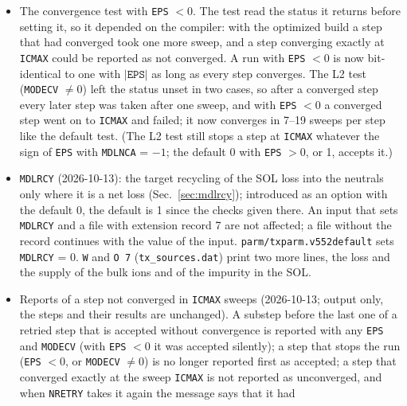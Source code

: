 \documentclass[11pt]{article}
\begin{document}
\begin{itemize}
  60) was read into arrays of the old size and the program stopped in the spline of the mesh.  They
  are now allocated again when \texttt{NRMAX} differs from their size; the ripple and NTV arrays,
  kept in the same way, likewise (with \texttt{FSRP} $\ne 0$ a \texttt{RUN} with another
  \texttt{NRMAX} in the same process corrupted the heap).  Such a \texttt{LOAD} now gives the state of
  a \texttt{LOAD} in a new process, bit for bit.
\item The convergence test with \texttt{EPS} $< 0$.  The test read the status it returns before
  setting it, so it depended on the compiler: with the optimized build a step that had converged took
  one more sweep, and a step converging exactly at \texttt{ICMAX} could be reported as not
  converged.  A run with \texttt{EPS} $< 0$ is now bit-identical to one with $|\texttt{EPS}|$ as long
  as every step converges.  The L2 test (\texttt{MODECV} $\ne 0$) left the status unset in two
  cases, so after a converged step every later step was taken after one sweep, and with
  \texttt{EPS} $< 0$ a converged step went on to \texttt{ICMAX} and failed; it now converges in 7--19
  sweeps per step like the default test.  (The L2 test still stops a step at \texttt{ICMAX} whatever
  the sign of \texttt{EPS} with \texttt{MDLNCA} = $-1$; the default 0 with \texttt{EPS} $>0$, or 1,
  accepts it.)
\item \texttt{MDLRCY} (2026-10-13): the target recycling of the SOL loss into the
  neutrals only where it is a net loss (Sec.~\ref{sec:mdlrcy}); introduced as an option with the
  default 0, the default is 1 since the checks given there.  An input that sets \texttt{MDLRCY} and a
  file with extension record 7 are not affected; a file without the record continues with the value of
  the input.  \texttt{parm/txparm.v552default} sets \texttt{MDLRCY} = 0.  \texttt{W} and \texttt{O 7}
  (\texttt{tx\_sources.dat}) print two more lines, the loss and the supply of the bulk ions and of the
  impurity in the SOL.
\item Reports of a step not converged in \texttt{ICMAX} sweeps (2026-10-13; output only, the steps and
  their results are unchanged).  A substep before the last one of a retried step that is accepted
  without convergence is reported with any \texttt{EPS} and \texttt{MODECV} (with \texttt{EPS} $<0$ it
  was accepted silently); a step that stops the run (\texttt{EPS} $<0$, or \texttt{MODECV} $\ne 0$) is
  no longer reported first as accepted; a step that converged exactly at the sweep \texttt{ICMAX} is not
  reported as unconverged, and when \texttt{NRETRY} takes it again the message says that it had

\end{itemize}
\end{document}
